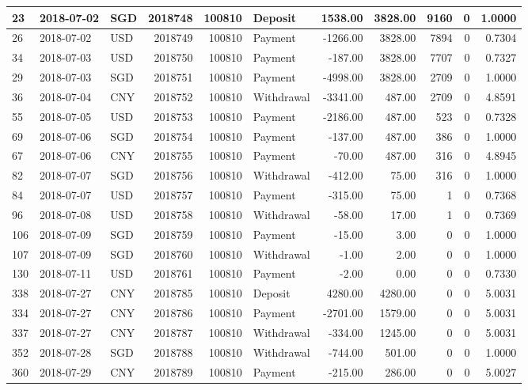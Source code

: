 \documentclass[]{article}
\begin{document}
\begin{table}[H]
\begin{tabular}{l|l|l|r|r|l|r|r|r|r|r}
\hline
23 & 2018-07-02 & SGD & 2018748 & 100810 & Deposit & 1538.00 & 3828.00 & 9160 & 0 & 1.0000\\
\hline
26 & 2018-07-02 & USD & 2018749 & 100810 & Payment & -1266.00 & 3828.00 & 7894 & 0 & 0.7304\\
\hline
34 & 2018-07-03 & USD & 2018750 & 100810 & Payment & -187.00 & 3828.00 & 7707 & 0 & 0.7327\\
\hline
29 & 2018-07-03 & SGD & 2018751 & 100810 & Payment & -4998.00 & 3828.00 & 2709 & 0 & 1.0000\\
\hline
36 & 2018-07-04 & CNY & 2018752 & 100810 & Withdrawal & -3341.00 & 487.00 & 2709 & 0 & 4.8591\\
\hline
55 & 2018-07-05 & USD & 2018753 & 100810 & Payment & -2186.00 & 487.00 & 523 & 0 & 0.7328\\
\hline
69 & 2018-07-06 & SGD & 2018754 & 100810 & Payment & -137.00 & 487.00 & 386 & 0 & 1.0000\\
\hline
67 & 2018-07-06 & CNY & 2018755 & 100810 & Payment & -70.00 & 487.00 & 316 & 0 & 4.8945\\
\hline
82 & 2018-07-07 & SGD & 2018756 & 100810 & Withdrawal & -412.00 & 75.00 & 316 & 0 & 1.0000\\
\hline
84 & 2018-07-07 & USD & 2018757 & 100810 & Payment & -315.00 & 75.00 & 1 & 0 & 0.7368\\
\hline
96 & 2018-07-08 & USD & 2018758 & 100810 & Withdrawal & -58.00 & 17.00 & 1 & 0 & 0.7369\\
\hline
106 & 2018-07-09 & SGD & 2018759 & 100810 & Payment & -15.00 & 3.00 & 0 & 0 & 1.0000\\
\hline
107 & 2018-07-09 & SGD & 2018760 & 100810 & Withdrawal & -1.00 & 2.00 & 0 & 0 & 1.0000\\
\hline
130 & 2018-07-11 & USD & 2018761 & 100810 & Payment & -2.00 & 0.00 & 0 & 0 & 0.7330\\
\hline
338 & 2018-07-27 & CNY & 2018785 & 100810 & Deposit & 4280.00 & 4280.00 & 0 & 0 & 5.0031\\
\hline
334 & 2018-07-27 & CNY & 2018786 & 100810 & Payment & -2701.00 & 1579.00 & 0 & 0 & 5.0031\\
\hline
337 & 2018-07-27 & CNY & 2018787 & 100810 & Withdrawal & -334.00 & 1245.00 & 0 & 0 & 5.0031\\
\hline
352 & 2018-07-28 & SGD & 2018788 & 100810 & Withdrawal & -744.00 & 501.00 & 0 & 0 & 1.0000\\
\hline
360 & 2018-07-29 & CNY & 2018789 & 100810 & Payment & -215.00 & 286.00 & 0 & 0 & 5.0027\\

\end{tabular}
\end{table}
\end{document}

